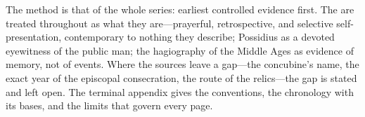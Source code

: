 The method is that of the whole series: earliest controlled evidence first.
The  are treated throughout as what they are---prayerful,
retrospective, and selective self-presentation, contemporary to nothing they
describe; Possidius as a devoted eyewitness of the public man; the
hagiography of the Middle Ages as evidence of memory, not of events. Where
the sources leave a gap---the concubine's name, the exact year of the
episcopal consecration, the route of the relics---the gap is stated and left
open. The terminal appendix gives the conventions, the chronology with its
bases, and the limits that govern every page.
